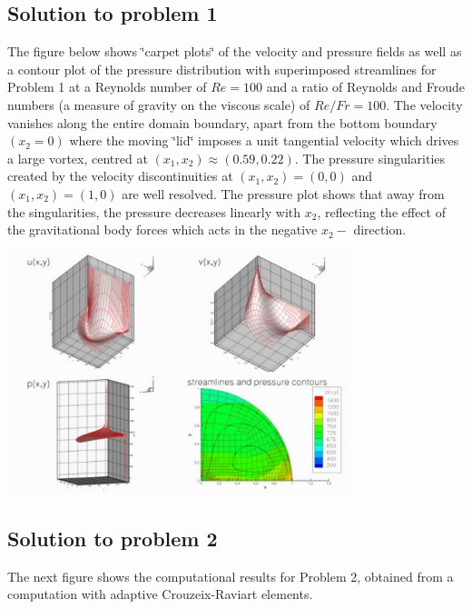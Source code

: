 \hypertarget{index_sol1}{}\subsection{Solution to problem 1}\label{index_sol1}
The figure below shows \char`\"{}carpet plots\char`\"{} of the velocity and pressure fields as well as a contour plot of the pressure distribution with superimposed streamlines for Problem 1 at a Reynolds number of $ Re=100$ and a ratio of Reynolds and Froude numbers (a measure of gravity on the viscous scale) of $ Re/Fr = 100$. The velocity vanishes along the entire domain boundary, apart from the bottom boundary $ (x_2 = 0) $ where the moving \char`\"{}lid\char`\"{} imposes a unit tangential velocity which drives a large vortex, centred at $ (x_1,x_2) \approx (0.59,0.22) $. The pressure singularities created by the velocity discontinuities at $ (x_1,x_2)=(0,0) $ and $ (x_1, x_2)=(1,0) $ are well resolved. The pressure plot shows that away from the singularities, the pressure decreases linearly with $ x_2 $, reflecting the effect of the gravitational body forces which acts in the negative $ x_2-$ direction.

 
\begin{DoxyImage}
\includegraphics[width=0.75\textwidth]{sol1}
\end{DoxyImage}




\hypertarget{index_sol2}{}\subsection{Solution to problem 2}\label{index_sol2}
The next figure shows the computational results for Problem 2, obtained from a computation with adaptive Crouzeix-\/\+Raviart elements.

